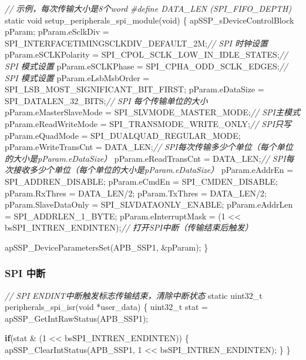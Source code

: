 \documentclass[
  12pt,
]{book}
\newenvironment{Shaded}{\begin{snugshade}}{\end{snugshade}}
\newcommand{\CommentTok}[1]{\textcolor[rgb]{0.56,0.35,0.01}{\textit{#1}}}
\newcommand{\ControlFlowTok}[1]{\textcolor[rgb]{0.13,0.29,0.53}{\textbf{#1}}}
\newcommand{\DataTypeTok}[1]{\textcolor[rgb]{0.13,0.29,0.53}{#1}}
\newcommand{\DecValTok}[1]{\textcolor[rgb]{0.00,0.00,0.81}{#1}}
\newcommand{\NormalTok}[1]{#1}
\newcommand{\PreprocessorTok}[1]{\textcolor[rgb]{0.56,0.35,0.01}{\textit{#1}}}
\begin{document}
\begin{Shaded}
\begin{Highlighting}[]
\CommentTok{// 示例，每次传输大小是8个word}
\PreprocessorTok{#define DATA_LEN (SPI_FIFO_DEPTH)}
\DataTypeTok{static} \DataTypeTok{void}\NormalTok{ setup_peripherals_spi_module(}\DataTypeTok{void}\NormalTok{)}
\NormalTok{\{}
\NormalTok{    apSSP_sDeviceControlBlock pParam;}
\NormalTok{    pParam.eSclkDiv = SPI_INTERFACETIMINGSCLKDIV_DEFAULT_2M;}\CommentTok{// SPI 时钟设置}
\NormalTok{    pParam.eSCLKPolarity = SPI_CPOL_SCLK_LOW_IN_IDLE_STATES;}\CommentTok{// SPI 模式设置}
\NormalTok{    pParam.eSCLKPhase = SPI_CPHA_ODD_SCLK_EDGES;}\CommentTok{// SPI 模式设置}
\NormalTok{    pParam.eLsbMsbOrder = SPI_LSB_MOST_SIGNIFICANT_BIT_FIRST;}
\NormalTok{    pParam.eDataSize = SPI_DATALEN_32_BITS;}\CommentTok{// SPI 每个传输单位的大小}
\NormalTok{    pParam.eMasterSlaveMode = SPI_SLVMODE_MASTER_MODE;}\CommentTok{// SPI主模式}
\NormalTok{    pParam.eReadWriteMode = SPI_TRANSMODE_WRITE_ONLY;}\CommentTok{// SPI只写}
\NormalTok{    pParam.eQuadMode = SPI_DUALQUAD_REGULAR_MODE;}
\NormalTok{    pParam.eWriteTransCnt = DATA_LEN;}\CommentTok{// SPI每次传输多少个单位（每个单位的大小是pParam.eDataSize）}
\NormalTok{    pParam.eReadTransCnt = DATA_LEN;}\CommentTok{// SPI每次接收多少个单位（每个单位的大小是pParam.eDataSize）}
\NormalTok{    pParam.eAddrEn = SPI_ADDREN_DISABLE;}
\NormalTok{    pParam.eCmdEn = SPI_CMDEN_DISABLE;}
\NormalTok{    pParam.RxThres = DATA_LEN/}\DecValTok{2}\NormalTok{;}
\NormalTok{    pParam.TxThres = DATA_LEN/}\DecValTok{2}\NormalTok{;}
\NormalTok{    pParam.SlaveDataOnly = SPI_SLVDATAONLY_ENABLE;}
\NormalTok{    pParam.eAddrLen = SPI_ADDRLEN_1_BYTE;}
\NormalTok{    pParam.eInterruptMask = (}\DecValTok{1}\NormalTok{ << bsSPI_INTREN_ENDINTEN);}\CommentTok{// 打开SPI中断（传输结束后触发）}
  
\NormalTok{    apSSP_DeviceParametersSet(APB_SSP1, &pParam);}
\NormalTok{\}}
\end{Highlighting}
\end{Shaded}

\hypertarget{spi-ux4e2dux65ad}{%
\subsubsection{SPI 中断}\label{spi-ux4e2dux65ad}}

\begin{Shaded}
\begin{Highlighting}[]
\CommentTok{// SPI ENDINT中断触发标志传输结束，清除中断状态}
\DataTypeTok{static} \DataTypeTok{uint32_t}\NormalTok{ peripherals_spi_isr(}\DataTypeTok{void}\NormalTok{ *user_data)}
\NormalTok{\{}
  \DataTypeTok{uint32_t}\NormalTok{ stat = apSSP_GetIntRawStatus(APB_SSP1);}
  
  \ControlFlowTok{if}\NormalTok{(stat & (}\DecValTok{1}\NormalTok{ << bsSPI_INTREN_ENDINTEN))}
\NormalTok{  \{}
\NormalTok{    apSSP_ClearIntStatus(APB_SSP1, }\DecValTok{1}\NormalTok{ << bsSPI_INTREN_ENDINTEN);}
\NormalTok{  \}  }
\NormalTok{\}}
\end{Highlighting}
\end{Shaded}
\end{document}
